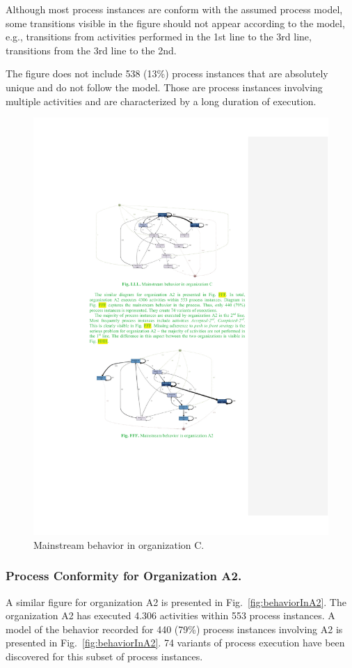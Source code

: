 \documentclass[lnbip]{svmultln}
\begin{document}
Although most process instances are conform with the assumed process model, some transitions visible in the figure should not appear according to the model, e.g., transitions from activities performed in the 1st line to the 3rd line, transitions from the 3rd line to the 2nd.

The figure does not include 538 (13\%) process instances that are absolutely unique and do not follow the model. Those are process instances involving multiple activities and are characterized by a long duration of execution.
 
\begin{figure}
  \begin{center}
    \includegraphics[width=.8\textwidth]{"figs/pic 36"}
  \end{center}
  \caption{Mainstream behavior in organization C.}
  \label{fig:behaviorInC}
\end{figure}

\subsubsection{Process Conformity for Organization A2.}
A similar figure for organization A2 is presented in Fig.~\ref{fig:behaviorInA2}. The organization A2 has executed 4.306 activities within 553 process instances. 
A model of the behavior recorded for 440 (79\%) process instances involving A2 is presented in Fig.~\ref{fig:behaviorInA2}. 74 variants of process execution have been discovered for this subset of process instances.
\end{document}
